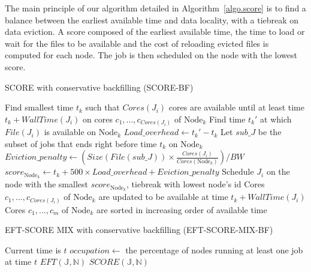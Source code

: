 \documentclass[conference,10pt]{IEEEtran}
\newcommand{\Node}[1]{\ensuremath{\mathrm{Node}_{#1}}\xspace}
\newcommand{\file}{\ensuremath{\mathit{File}}\xspace}
\newcommand{\size}{\ensuremath{\mathit{Size}}\xspace}
\newcommand{\bandwidth}{\mathit{BW}\xspace}
\newcommand{\core}{\mathit{Cores}\xspace}
\newcommand{\walltime}{\mathit{WallTime}\xspace}
\newcommand{\jobset}{\ensuremath{\mathbb{J}}\xspace}
\newcommand{\nodeset}{\ensuremath{\mathbb{N}}\xspace}
\begin{document}
The main principle of our algorithm detailed in Algorithm~\ref{algo.score} 
is to find a balance between the earliest available time and data locality,
with a tiebreak on data eviction. A score composed of the earliest available 
time, the time to load or wait for the files to be available and the cost of 
reloading evicted files is computed for each node. The job is then scheduled
on the node with the lowest score.


\begin{algorithm*}[htb]%
\caption{SCORE with conservative backfilling (SCORE-BF)}\label{algo.score}
\begin{algorithmic}[1]
		\ForEach{$\Node{k} \in \nodeset$}
			\State Find smallest time $t_k$ such that $\core(J_i)$ cores are available until at least time $t_k + \walltime(J_i)$ on cores $c_1, ..., c_{\core(J_i)}$ of $\Node{k}$
			\State Find time $t_k'$ at which $\file(J_i)$ is available on $\Node{k}$
			\State $Load\_overhead \gets t_k' - t_k$ 
			\State Let $\mathit{sub\_J}$ be the subset of jobs that ends right before time $t_k$ on $\Node{k}$
			\State $Eviction\_penalty \gets (\size(\file(\mathit{sub\_J})) \times \frac{\core(J_i)}{\core(\Node{k})})/\bandwidth$
			\State $score_{\Node{k}} \gets t_k + 500 \times Load\_overhead + Eviction\_penalty$
		\EndFor
		\State Schedule $J_i$ on the node with the smallest $score_{\Node{k}}$, tiebreak with lowest node's id
		\State Cores $c_1, ..., c_{\core(J_i)}$ of $\Node{k}$ are updated to be available at time $t_k + \walltime(J_i)$
		\State Cores $c_1, ..., c_m$ of $\Node{k}$ are sorted in increasing order of available time
	\EndFor
\end{algorithmic}
\end{algorithm*}

\begin{algorithm*}[htb]%
\caption{EFT-SCORE MIX with conservative backfilling (EFT-SCORE-MIX-BF)}
\begin{algorithmic}[1]
	\Statex Current time is $t$
		\State $occupation \gets$ the percentage of nodes running at least one job at time $t$
			\State $EFT(\jobset,\nodeset)$
		\Else
			\State $SCORE(\jobset,\nodeset)$
		\EndIf
	\EndFor
\end{algorithmic}
\end{algorithm*}
\end{document}
